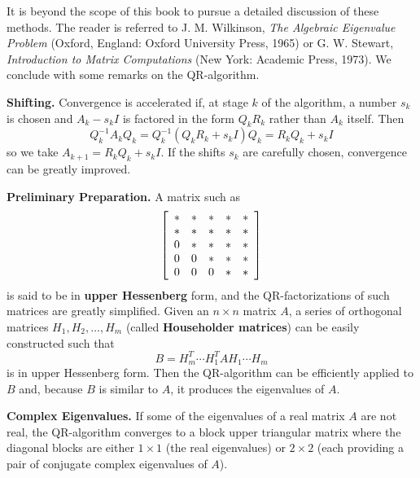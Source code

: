 It is beyond the scope of this book to 
pursue a detailed discussion of these methods. The reader is referred to
 J. M. Wilkinson, \textit{The Algebraic Eigenvalue Problem} (Oxford, England: Oxford University Press, 1965) or G. W. Stewart, \textit{Introduction to Matrix Computations} (New York: Academic Press, 1973). We conclude with some remarks on the QR-algorithm.

\smallskip
\noindent\textbf{Shifting.} Convergence is accelerated if, at stage $k$ of the algorithm, a number $s_{k}$ is chosen and $A_{k} - s_{k}I$ is factored in the form $Q_{k}R_{k}$ rather than $A_{k}$ itself. Then
\begin{equation*}
Q_{k}^{-1}A_{k}Q_{k} = Q_{k}^{-1}(Q_{k}R_{k} + s_{k}I)Q_{k} = R_{k}Q_{k} + s_{k}I
\end{equation*}
so we take $A_{k+1} = R_{k}Q_{k} + s_{k}I$. If the shifts $s_{k}$ are carefully chosen, convergence can be greatly improved.

\smallskip
\noindent\textbf{Preliminary Preparation.} A matrix such as
\begin{equation*}
\left[ \begin{array}{rrrrr}
\ast  & \ast & \ast & \ast & \ast  \\
\ast  & \ast & \ast & \ast & \ast  \\
0  & \ast & \ast & \ast & \ast  \\
0  & 0 & \ast & \ast & \ast  \\
0  & 0 & 0 & \ast & \ast  \\
\end{array}\right]
\end{equation*}
is said to be in \textbf{upper Hessenberg} form, and the QR-factorizations of such matrices are greatly simplified. Given an $n \times n$ matrix $A$, a series of orthogonal matrices $H_{1}, H_{2}, \dots, H_{m}$ (called \textbf{Householder matrices}) can be easily constructed such that
\begin{equation*}
B = H_{m}^T \cdots H_{1}^TAH_{1} \cdots H_{m}
\end{equation*}
is in upper Hessenberg form. Then the QR-algorithm can be efficiently applied to $B$ and, because $B$ is similar to $A$, it produces the eigenvalues of $A$.

\smallskip
\noindent\textbf{Complex Eigenvalues.} If some of the eigenvalues of a real matrix $A$ are not real, the QR-algorithm converges to a block upper triangular matrix where the diagonal blocks are either $1 \times 1$ (the real eigenvalues) or $2 \times 2$ (each providing a pair of conjugate complex eigenvalues of $A$).

